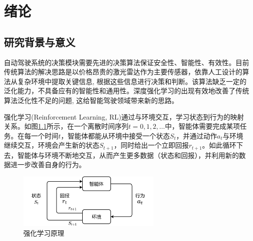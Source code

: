 %
%
%
%
%
%

\chapter{绪论} %

\section{研究背景与意义}\label{1.1研究背景与意义} %

自动驾驶系统的决策模块需要先进的决策算法保证安全性、智能性、有效性。目前传统算法的解决思路是以价格昂贵的激光雷达作为主要传感器，依靠人工设计的算法从复杂环境中提取关键信息, 根据这些信息进行决策和判断。该算法缺乏一定的泛化能力，不具备应有的智能性和通用性。深度强化学习的出现有效地改善了传统算法泛化性不足的问题, 这给智能驾驶领域带来新的思路。

强化学习(Reinforcement Learning, RL)通过与环境交互，学习状态到行为的映射关系。如图\ref{强化学习原理}所示，在一个离散时间序列$t=0,1,2,… $中，智能体需要完成某项任务。在每一个时间$t$，智能体都能从环境中接受一个状态$S_t$，并通过动作$a_t$与环境继续交互，环境会产生新的状态$S_{t+1}$，同时给出一个立即回报$r_{t+1}$。如此循环下去，智能体与环境不断地交互，从而产生更多数据（状态和回报），并利用新的数据进一步改善自身的行为。

\begin{figure}[htbp]
  \vspace{13pt} %
  \centering
  \includegraphics[width=0.63\textwidth]{images/chapter1/RL_structure.png}
  \caption{强化学习原理}\label{强化学习原理} %
\end{figure}

